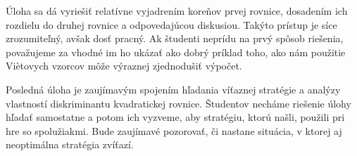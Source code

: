 

\kom Úloha sa dá vyriešiť relatívne  vyjadrením koreňov prvej rovnice, dosadením ich rozdielu do druhej rovnice a odpovedajúcou diskusiou. Takýto prístup je síce zrozumiteľný, avšak dosť pracný. Ak študenti neprídu na prvý spôsob riešenia, považujeme za vhodné im ho ukázať ako dobrý príklad toho, ako nám použitie Viètovych vzorcov môže výraznej zjednodušiť výpočet.



\kom Posledná úloha je zaujímavým spojením hľadania víťaznej stratégie a analýzy vlastností diskriminantu kvadratickej rovnice. Študentov necháme riešenie úlohy hľadať samostatne a potom ich vyzveme, aby stratégiu, ktorú našli, použili pri hre so spolužiakmi. Bude zaujímavé pozorovať, či nastane situácia, v ktorej aj neoptimálna stratégia zvíťazí.





